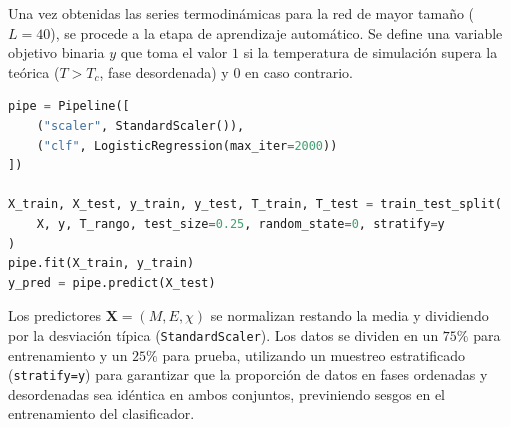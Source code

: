 Una vez obtenidas las series termodinámicas para la red de mayor tamaño ($L=40$), se procede a la etapa de aprendizaje automático. Se define una variable objetivo binaria $y$ que toma el valor $1$ si la temperatura de simulación supera la teórica ($T > T_c$, fase desordenada) y $0$ en caso contrario. 

\begin{lstlisting}[language=python, caption=Pipeline de clasificación con Scikit-Learn.]
pipe = Pipeline([
    ("scaler", StandardScaler()), 
    ("clf", LogisticRegression(max_iter=2000)) 
])

X_train, X_test, y_train, y_test, T_train, T_test = train_test_split(
    X, y, T_rango, test_size=0.25, random_state=0, stratify=y 
)
pipe.fit(X_train, y_train)
y_pred = pipe.predict(X_test)
\end{lstlisting}

Los predictores $\mathbf{X} = (M, E, \chi)$ se normalizan restando la media y dividiendo por la desviación típica (\texttt{StandardScaler}). Los datos se dividen en un $75\%$ para entrenamiento y un $25\%$ para prueba, utilizando un muestreo estratificado (\texttt{stratify=y}) para garantizar que la proporción de datos en fases ordenadas y desordenadas sea idéntica en ambos conjuntos, previniendo sesgos en el entrenamiento del clasificador.